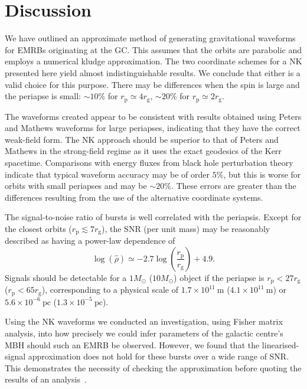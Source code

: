 \documentclass[useAMS,usedcolumn,usegraphicx,usenatbib]{mn2e}
\newcommand{\units}[1]{\ensuremath{~\mathrm{#1}}}
\newcommand{\sub}[1]{\ensuremath{_\mathrm{#1}}}
\begin{document}
\section{Discussion}\label{sec:End}

We have outlined an approximate method of generating gravitational waveforms for EMRBs originating at the GC. This assumes that the orbits are parabolic and employs a numerical kludge approximation. The two coordinate schemes for a NK presented here yield almost indistinguishable results. We conclude that either is a valid choice for this purpose. There may be differences when the spin is large and the periapse is small: $\sim 10\%$ for $r\sub{p} \simeq 4 r\sub{g}$, $\sim 20\%$ for $r\sub{p} \simeq 2 r\sub{g}$.

The waveforms created appear to be consistent with results obtained using Peters and Mathews waveforms for large periapses, indicating that they have the correct weak-field form. The NK approach should be superior to that of Peters and Mathews in the strong-field regime as it uses the exact geodesics of the Kerr spacetime. Comparisons with energy fluxes from black hole perturbation theory indicate that typical waveform accuracy may be of order $5\%$, but this is worse for orbits with small periapses and may be $\sim 20\%$. These errors are greater than the differences resulting from the use of the alternative coordinate systems.

The signal-to-noise ratio of bursts is well correlated with the periapsis. Except for the closest orbits ($r\sub{p} \lesssim 7 r\sub{g}$), the SNR (per unit mass) may be reasonably described as having a power-law dependence of
\begin{equation}
\log\left(\hat{\rho}\right) \simeq -2.7\log\left(\frac{r\sub{p}}{r\sub{g}}\right) + 4.9.
\end{equation}
Signals should be detectable for a $1 M_\odot$ ($10 M_\odot$) object if the periapse is $r\sub{p} < 27 r\sub{g}$ ($r\sub{p} < 65 r\sub{g}$), corresponding to a physical scale of $1.7 \times 10^{11}\units{m}$ ($4.1 \times 10^{11}\units{m}$) or $5.6 \times 10^{-6}\units{pc}$ ($1.3 \times 10^{-5}\units{pc}$).

Using the NK waveforms we conducted an investigation, using Fisher matrix analysis, into how precisely we could infer parameters of the galactic centre's MBH should such an EMRB be observed. However, we found that the linearised-signal approximation does not hold for these bursts over a wide range of SNR. This demonstrates the necessity of checking the approximation before quoting the results of an analysis~\citep{Vallisneri2008}.
\end{document}
